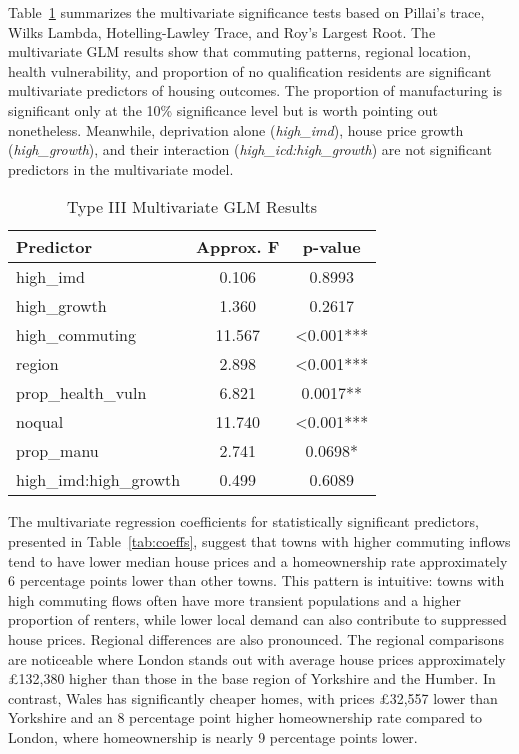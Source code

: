 \documentclass[12pt]{article}
\begin{document}
Table~\ref{tab:manova_summary} summarizes the multivariate significance tests based on Pillai's trace, Wilks Lambda, Hotelling-Lawley Trace, and Roy's Largest Root. The multivariate GLM results show that commuting patterns, regional location, health vulnerability, and proportion of no qualification residents are significant multivariate predictors of housing outcomes. The proportion of manufacturing is significant only at the 10\% significance level but is worth pointing out nonetheless. Meanwhile, deprivation alone (\textit{high\_imd}), house price growth (\textit{high\_growth}), and their interaction (\textit{high\_icd:high\_growth}) are not significant predictors in the multivariate model. 

\begin{table}[htbp]
\centering
\caption{Type III Multivariate GLM Results}
\label{tab:manova_summary}
\begin{tabular}{lcc}
\hline
\textbf{Predictor} & \textbf{Approx. F} & \textbf{p-value} \\
\hline
high\_imd & 0.106 & 0.8993 \\
high\_growth & 1.360 & 0.2617 \\
high\_commuting & 11.567 & \textless{}0.001*** \\
region & 2.898 & \textless{}0.001*** \\
prop\_health\_vuln & 6.821 & 0.0017** \\
noqual & 11.740 & \textless{}0.001*** \\
prop\_manu & 2.741 & 0.0698* \\
high\_imd:high\_growth & 0.499 & 0.6089 \\
\hline
\end{tabular}
\end{table}

The multivariate regression coefficients for statistically significant predictors, presented in Table~\ref{tab:coeffs}, suggest that towns with higher commuting inflows tend to have lower median house prices and a homeownership rate approximately 6 percentage points lower than other towns. This pattern is intuitive: towns with high commuting flows often have more transient populations and a higher proportion of renters, while lower local demand can also contribute to suppressed house prices. Regional differences are also pronounced. The regional comparisons are noticeable where London stands out with average house prices approximately \pounds132,380 higher than those in the base region of Yorkshire and the Humber. In contrast, Wales has significantly cheaper homes, with prices \pounds32,557 lower than Yorkshire and an 8 percentage point higher homeownership rate compared to London, where homeownership is nearly 9 percentage points lower.
\end{document}

